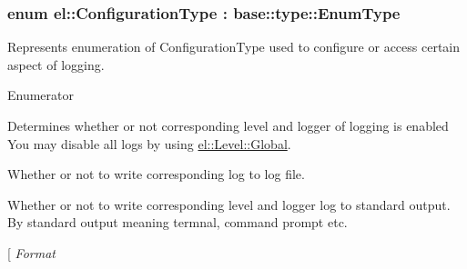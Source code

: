 \subsubsection[{\texorpdfstring{Configuration\+Type}{ConfigurationType}}]{\setlength{\rightskip}{0pt plus 5cm}enum {\bf el\+::\+Configuration\+Type} \+: base\+::type\+::\+Enum\+Type\hspace{0.3cm}{\ttfamily [strong]}}\hypertarget{namespaceel_a281f5db6d6163678bc68a8b23b59e124}{}\label{namespaceel_a281f5db6d6163678bc68a8b23b59e124}


Represents enumeration of Configuration\+Type used to configure or access certain aspect of logging. 

\begin{Desc}
\item[Enumerator]\par
\begin{description}
\item[{\em 
Enabled\hypertarget{namespaceel_a281f5db6d6163678bc68a8b23b59e124a00d23a76e43b46dae9ec7aa9dcbebb32}{}\label{namespaceel_a281f5db6d6163678bc68a8b23b59e124a00d23a76e43b46dae9ec7aa9dcbebb32}
}]Determines whether or not corresponding level and logger of logging is enabled You may disable all logs by using \hyperlink{namespaceel_ab0ac6091262344c52dd2d3ad099e8e36a4cc6684df7b4a92b1dec6fce3264fac8}{el\+::\+Level\+::\+Global}. \item[{\em 
To\+File\hypertarget{namespaceel_a281f5db6d6163678bc68a8b23b59e124acb76297988b895ca263f62728b32dbcc}{}\label{namespaceel_a281f5db6d6163678bc68a8b23b59e124acb76297988b895ca263f62728b32dbcc}
}]Whether or not to write corresponding log to log file. \item[{\em 
To\+Standard\+Output\hypertarget{namespaceel_a281f5db6d6163678bc68a8b23b59e124a9b9a9244b0b26da988f9af8310ab899d}{}\label{namespaceel_a281f5db6d6163678bc68a8b23b59e124a9b9a9244b0b26da988f9af8310ab899d}
}]Whether or not to write corresponding level and logger log to standard output. By standard output meaning termnal, command prompt etc. \item[{\em 
Format\hypertarget{namespaceel_a281f5db6d6163678bc68a8b23b59e124a520d0db389f362bf79ef56ca0af3dcab}{}\label{namespaceel_a281f5db6d6163678bc68a8b23b59e124a520d0db389f362bf79ef56ca0af3dcab}
}
\end{description}
\end{Desc}
